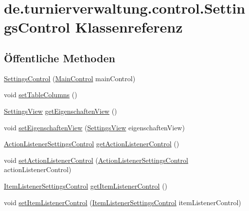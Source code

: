 \hypertarget{classde_1_1turnierverwaltung_1_1control_1_1_settings_control}{}\section{de.\+turnierverwaltung.\+control.\+Settings\+Control Klassenreferenz}
\label{classde_1_1turnierverwaltung_1_1control_1_1_settings_control}
\subsection*{Öffentliche Methoden}
\begin{DoxyCompactItemize}
\item 
\hyperlink{classde_1_1turnierverwaltung_1_1control_1_1_settings_control_a91415693a1a5d8489e14b9566495d1e6}{Settings\+Control} (\hyperlink{classde_1_1turnierverwaltung_1_1control_1_1_main_control}{Main\+Control} main\+Control)
\item 
void \hyperlink{classde_1_1turnierverwaltung_1_1control_1_1_settings_control_a50a796f370a38bf7245ac90f75be7d90}{set\+Table\+Columns} ()
\item 
\hyperlink{classde_1_1turnierverwaltung_1_1view_1_1_settings_view}{Settings\+View} \hyperlink{classde_1_1turnierverwaltung_1_1control_1_1_settings_control_a425739326c359d6728fbc858465eb855}{get\+Eigenschaften\+View} ()
\item 
void \hyperlink{classde_1_1turnierverwaltung_1_1control_1_1_settings_control_a0b3bfd68ca46843cd29660c1be258117}{set\+Eigenschaften\+View} (\hyperlink{classde_1_1turnierverwaltung_1_1view_1_1_settings_view}{Settings\+View} eigenschaften\+View)
\item 
\hyperlink{classde_1_1turnierverwaltung_1_1control_1_1_action_listener_settings_control}{Action\+Listener\+Settings\+Control} \hyperlink{classde_1_1turnierverwaltung_1_1control_1_1_settings_control_af2ca9258997e6883db4e2f52ee1a5c4e}{get\+Action\+Listener\+Control} ()
\item 
void \hyperlink{classde_1_1turnierverwaltung_1_1control_1_1_settings_control_a4cc6bc8fe721a90885b05666e3ce8f35}{set\+Action\+Listener\+Control} (\hyperlink{classde_1_1turnierverwaltung_1_1control_1_1_action_listener_settings_control}{Action\+Listener\+Settings\+Control} action\+Listener\+Control)
\item 
\hyperlink{classde_1_1turnierverwaltung_1_1control_1_1_item_listener_settings_control}{Item\+Listener\+Settings\+Control} \hyperlink{classde_1_1turnierverwaltung_1_1control_1_1_settings_control_aefa73b8200ac1c68d5c46a4e6fce61e0}{get\+Item\+Listener\+Control} ()
\item 
void \hyperlink{classde_1_1turnierverwaltung_1_1control_1_1_settings_control_a209c756aeae9171ca44f1c17e8db9393}{set\+Item\+Listener\+Control} (\hyperlink{classde_1_1turnierverwaltung_1_1control_1_1_item_listener_settings_control}{Item\+Listener\+Settings\+Control} item\+Listener\+Control)
\end{DoxyCompactItemize}


